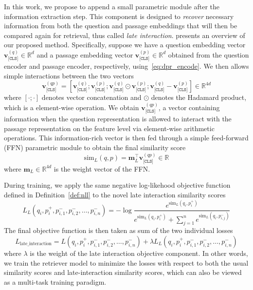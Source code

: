 %
In this work, we propose to append a small parametric module after the information extraction step.
%
This component is designed to \emph{recover} necessary information from both the question and passage embeddings that will then be compared again for retrieval, thus called \emph{late interaction}.
%
 presents an overview of our proposed method.
%
Specifically, suppose we have a question embedding vector $\mathbf{v}^{(q)}_{\texttt{[CLS]}} \in \mathbb{R}^d$ and a passage embedding vector $\mathbf{v}^{(p)}_{\texttt{[CLS]}} \in \mathbb{R}^d$ obtained from the question encoder and passage encoder, respectively, using~\eqref{eq:dpr_encode}.
%
We then allows simple interactions between the two vectors
%
\begin{equation}
\label{eq:late_concat}
\mathbf{v}^{(qp)}_{\texttt{[CLS]}} = [\mathbf{v}^{(q)}_{\texttt{[CLS]}}; \mathbf{v}^{(p)}_{\texttt{[CLS]}}; \mathbf{v}^{(q)}_{\texttt{[CLS]}} \odot \mathbf{v}^{(p)}_{\texttt{[CLS]}}; \mathbf{v}^{(q)}_{\texttt{[CLS]}} - \mathbf{v}^{(p)}_{\texttt{[CLS]}}] \in \mathbb{R}^{4d}
\end{equation}
where $[\cdot;\cdot]$ denotes vector concatenation and $\odot$ denotes the Hadamard product, which is a element-wise operation.
%
We obtain $\mathbf{v}^{(qp)}_{\texttt{[CLS]}}$, a vector containing information when the question representation is allowed to interact with the passage representation on the feature level via element-wise arithmetic operations.
%
This information-rich vector is then fed through a simple feed-forward (FFN) parametric module to obtain the final similarity score
\begin{equation}
\label{eq:late_sim}
\text{sim}_L(q, p) = \mathbf{m}_L^\intercal \mathbf{v}^{(qp)}_{\texttt{[CLS]}}  \in \mathbb{R}
\end{equation}
%
where $\mathbf{m}_L \in \mathbb{R}^{4d}$ is the weight vector of the FFN.

During training, we apply the same negative log-likehood objective function defined in Definition~\ref{def:nll} to the novel late interaction similarity scores
%
\begin{equation}
L_L(q_i, p^{+}_i, p^{-}_{i, 1}, p^{-}_{i, 2}, \ldots, p^{-}_{i, n}) = - \log \frac{e^{\text{sim}_L(q_i, p^{+}_i)}}{e^{\text{sim}_L(q_i, p^{+}_i)} + \sum_{j = 1}^{n} e^{\text{sim}_L(q_i, p^{-}_{i, j})}}
\end{equation}
%
The final objective function is then taken as sum of the two individual losses
\begin{equation}
L_{\text{late\_interaction}} = L(q_i, p^{+}_i, p^{-}_{i, 1}, p^{-}_{i, 2}, \ldots, p^{-}_{i, n}) + \lambda L_L(q_i, p^{+}_i, p^{-}_{i, 1}, p^{-}_{i, 2}, \ldots, p^{-}_{i, n})
\end{equation}
%
where $\lambda$ is the weight of the late interaction objective component.
%
In other words, we train the retriever model to minimize the losses with respect to both the usual similarity scores and late-interaction similarity scores, which can also be viewed as a multi-task training paradigm.

